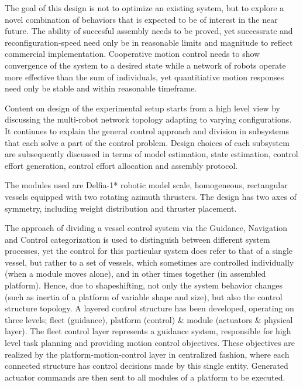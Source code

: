 
The goal of this design is not to optimize an existing system, but to explore a novel combination of behaviors that is expected to be of interest in the near future. 
The ability of succesful assembly needs to be proved, yet successrate and reconfiguration-speed need only be in reasonable limits and magnitude to reflect commercial implementation. Cooperative motion control needs to show convergence of the system to a desired state while a network of robots operate more effective than the sum of individuals, yet quantitiative motion responses need only be stable and within reasonable timeframe. 

Content on design of the experimental setup starts from a high level view by discussing the multi-robot network topology adapting to varying configurations. It continues to explain the general control approach and division in subsystems that each solve a part of the control problem. Design choices of each subsystem are subsequently discussed in terms of model estimation, state estimation, control effort generation, control effort allocation and  assembly protocol. 

The modules used are Delfia-1* robotic model scale, homogeneous, rectangular vessels equipped with two rotating azimuth thrusters. The design has two axes of symmetry, including weight distribution and thruster placement.

The approach of dividing a vessel control system via the Guidance, Navigation and Control categorization is used to distinguish between different system processes, yet the control for this particular system does refer to that of a single vessel, but rather to a set of vessels, which sometimes are controlled individually (when a module moves alone), and in other times together (in assembled platform). Hence, due to shapeshifting, not only the system behavior changes (such as inertia of a platform of variable shape and size), but also the control structure topology.
A layered control structure has been developed, operating on three levels; fleet (guidance), platform (control) \& module (actuators \& physical layer). The fleet control layer represents a guidance system, responsible for high level task planning and providing motion control objectives. These objectives are realized by the platform-motion-control layer in centralized fashion, where each connected structure has control decisions made by this single entity. Generated actuator commands are then sent to all modules of a platform to be executed. 

